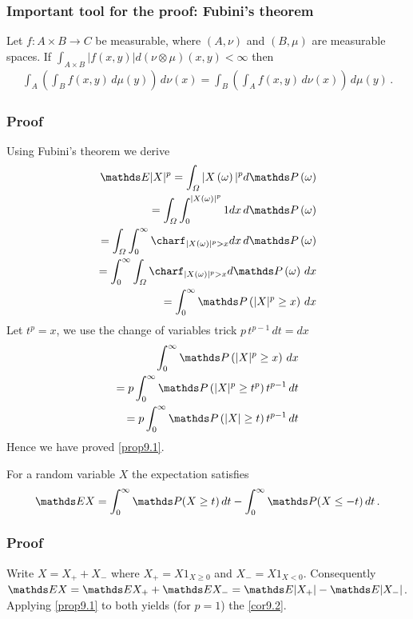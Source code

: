 \documentclass[a4paper, english, headtopline=0.08em, headsepline=0.04em, left = 1cm, right = 1cm, DIV=15]{article}
\begin{document}
\subsubsection*{Important tool for the proof: Fubini's theorem}
Let $f : A \times B \rightarrow C$ be measurable,
 where $(A, \nu)$ and $(B, \mu)$ are
measurable spaces. If $\int_{A\times B} |f(x, y)| d(\nu \otimes  \mu)(x, y) < \infty $ then 
\begin{align*}
	\int_{ A}\left(\int_{ B}f(x,y)\,d\mu (y)\right)\,d\nu(x)=\int_{ B}\left(\int_{ A}f(x,y)\,d\nu(x)\right)\,d\mu(y)\,.
\end{align*}
\subsubsection*{Proof}
Using Fubini's theorem we derive 
\begin{align*}
	\EE |X|^p = \int_\Omega |X\left(\omega\right)|^p d\PP\left(\omega\right) \\
	= \int_\Omega \int_0^{|X\left(\omega\right)|^p} 1dx \, d\PP\left(\omega\right) \\
	= \int_\Omega \int_0^{\infty} \charf_{|X\left(\omega\right)|^p > x} dx \, d\PP\left(\omega\right) \\
	= \int_0^{\infty} \int_\Omega \charf_{|X\left(\omega\right)|^p > x} d\PP\left(\omega\right) \, dx \\
	= \int_0^{\infty} \PP\left(|X|^p \geq x\right) \, dx 
\end{align*}
Let $t^p = x$, we use the change of variables trick $p \, t^{p-1} \, dt = dx$
\begin{align*}
	\int_0^{\infty} \PP\left(|X|^p \geq x\right) \, dx \\
	= p\int_0^{\infty} \PP\left(|X|^p \geq t^p \right) t^{p-1} \, dt \\
	= p\int_0^{\infty} \PP\left(|X| \geq t \right) t^{p-1} \, dt 
\end{align*}
Hence we have proved \cref{prop9.1}.

\begin{corollary} \label{cor9.2}
	For a random variable $X$ the expectation satisfies
	\begin{align} \label{eq3_cor9.2}
		\EE X=\int_{0}^{\infty}\PP (X\geq t)\,dt-\int_{0}^{\infty}\PP (X\leq-t)\,dt\,.
	\end{align}
\end{corollary}
\subsubsection*{Proof}
Write $X=X_+ + X_-$ where $X_+ = X1_{X\geq 0}$ and $X_- = X1_{X < 0}$. Consequently
$\EE X = \EE X_+ + \EE X_- = \EE |X_+| - \EE |X_-|$. Applying \cref{prop9.1} to both yields (for $p=1$) the \cref{cor9.2}.
\end{document}
